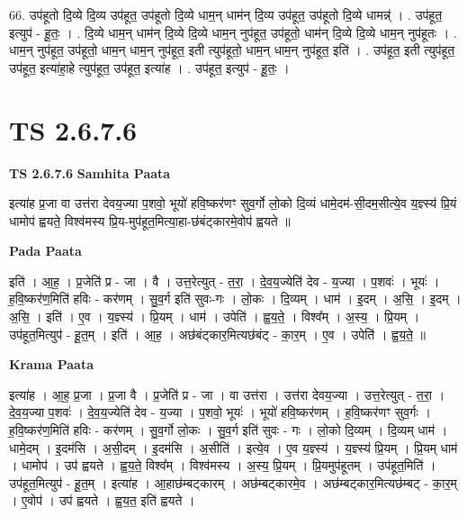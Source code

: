 \documentclass[17pt]{extarticle}
\begin{document}
66. उप॑हूतो दि॒व्ये दि॒व्य उप॑हूत॒ उप॑हूतो दि॒व्ये धाम॒न् धाम॑न् दि॒व्य उप॑हूत॒ उप॑हूतो दि॒व्ये धामन्न्॑ । . उप॑हूत॒ इत्युप॑ - हू॒तः॒ । . दि॒व्ये धाम॒न् धाम॑न् दि॒व्ये दि॒व्ये धाम॒न् नुप॑हूत॒ उप॑हूतो॒ धाम॑न् दि॒व्ये दि॒व्ये धाम॒न् नुप॑हूतः । . धाम॒न् नुप॑हूत॒ उप॑हूतो॒ धाम॒न् धाम॒न् नुप॑हूत॒ इती त्युप॑हूतो॒ धाम॒न् धाम॒न् नुप॑हूत॒ इति॑ । . उप॑हूत॒ इती त्युप॑हूत॒ उप॑हूत॒ इत्या॑हा॒हे त्युप॑हूत॒ उप॑हूत॒ इत्या॑ह । . उप॑हूत॒ इत्युप॑ - हू॒तः॒ । \newline
\pagebreak
{}
\section*{ TS 2.6.7.6 }

\textbf{TS 2.6.7.6 } \newline
\textbf{Samhita Paata} \newline

इत्या॑ह प्र॒जा वा उत्त॑रा देवय॒ज्या प॒शवो॒ भूयो॑ हवि॒ष्कर॑णꣳ सुव॒र्गो लो॒को दि॒व्यं धामे॒दम॑-सी॒दम॒सीत्ये॒व य॒ज्ञ्स्य॑ प्रि॒यं धामोप॑ ह्वयते॒ विश्व॑मस्य प्रि॒य-मुप॑हूत॒मित्या॒हा-छ॑बंट्कारमे॒वोप॑ ह्वयते ॥ \newline

\textbf{Pada Paata} \newline

इति॑ । आ॒ह॒ । प्र॒जेति॑ प्र - जा । वै । उत्त॒रेत्युत् - त॒रा॒ । दे॒व॒य॒ज्येति॑ देव - य॒ज्या । प॒शवः॑ । भूयः॑ । ह॒वि॒ष्कर॑ण॒मिति॑ हविः - कर॑णम् । सु॒व॒र्ग इति॑ सुवः-गः । लो॒कः । दि॒व्यम् । धाम॑ । इ॒दम् । अ॒सि॒ । इ॒दम् । अ॒सि॒ । इति॑ । ए॒व । य॒ज्ञ्स्य॑ । प्रि॒यम् । धाम॑ । उपेति॑ । ह्व॒य॒ते॒ । विश्व᳚म् । अ॒स्य॒ । प्रि॒यम् । उप॑हूत॒मित्युप॑ - हू॒त॒म् । इति॑ । आ॒ह॒ । अछ॑बंट्कार॒मित्यछ॑बंट् - का॒र॒म् । ए॒व । उपेति॑ । ह्व॒य॒ते॒ ॥  \newline


\textbf{Krama Paata} \newline

इत्या॑ह । आ॒ह॒ प्र॒जा । प्र॒जा वै । प्र॒जेति॑ प्र - जा । वा उत्त॑रा । उत्त॑रा देवय॒ज्या । उत्त॒रेत्युत् - त॒रा॒ । दे॒व॒य॒ज्या प॒शवः॑ । दे॒व॒य॒ज्येति॑ देव - य॒ज्या । प॒शवो॒ भूयः॑ । भूयो॑ हवि॒ष्कर॑णम् । ह॒वि॒ष्कर॑णꣳ सुव॒र्गः । ह॒वि॒ष्कर॑ण॒मिति॑ हविः - कर॑णम् । सु॒व॒र्गो लो॒कः । सु॒व॒र्ग इति॑ सुवः - गः । लो॒को दि॒व्यम् । दि॒व्यम् धाम॑ । धामे॒दम् । इ॒दम॑सि । अ॒सी॒दम् । इ॒दम॑सि । अ॒सीति॑ । इत्ये॒व । ए॒व य॒ज्ञ्स्य॑ । य॒ज्ञ्स्य॑ प्रि॒यम् । प्रि॒यम् धाम॑ । धामोप॑ । उप॑ ह्वयते । ह्व॒य॒ते॒ विश्व᳚म् । विश्व॑मस्य । अ॒स्य॒ प्रि॒यम् । प्रि॒यमुप॑हूतम् । उप॑हूत॒मिति॑ । उप॑हूत॒मित्युप॑ - हू॒त॒म् । इत्या॑ह । आ॒हाछ॑म्बट्कारम् । अछ॑म्बट्कारमे॒व । अछ॑म्बट्कार॒मित्यछ॑म्बट् - का॒र॒म् । ए॒वोप॑ । उप॑ ह्वयते । ह्व॒य॒त॒ इति॑ ह्वयते । \newline
\end{document}
